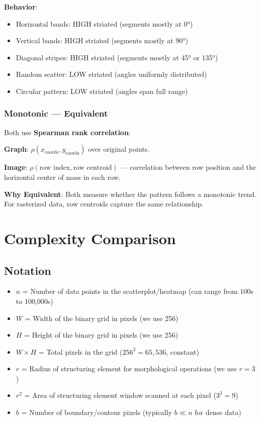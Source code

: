 \documentclass[11pt]{article}
\begin{document}
\textbf{Behavior}:
\begin{itemize}
    \item Horizontal bands: HIGH striated (segments mostly at 0°)
    \item Vertical bands: HIGH striated (segments mostly at 90°)
    \item Diagonal stripes: HIGH striated (segments mostly at 45° or 135°)
    \item Random scatter: LOW striated (angles uniformly distributed)
    \item Circular pattern: LOW striated (angles span full range)
\end{itemize}

\subsubsection{Monotonic — \textcolor{equivalent}{Equivalent}}

Both use \textbf{Spearman rank correlation}:

\textbf{Graph}: $\rho(x_{\text{coords}}, y_{\text{coords}})$ over original points.

\textbf{Image}: $\rho(\text{row index}, \text{row centroid})$ — correlation between row position and the horizontal center of mass in each row.

\textbf{Why Equivalent}: Both measure whether the pattern follows a monotonic trend. For rasterized data, row centroids capture the same relationship.

\section{Complexity Comparison}

\subsection{Notation}

\begin{itemize}
    \item $n$ = Number of data points in the scatterplot/heatmap (can range from 100s to 100,000s)
    \item $W$ = Width of the binary grid in pixels (we use 256)
    \item $H$ = Height of the binary grid in pixels (we use 256)
    \item $W \times H$ = Total pixels in the grid ($256^2 = 65,536$, constant)
    \item $r$ = Radius of structuring element for morphological operations (we use $r=3$)
    \item $r^2$ = Area of structuring element window scanned at each pixel ($3^2 = 9$)
    \item $b$ = Number of boundary/contour pixels (typically $b \ll n$ for dense data)
\end{itemize}
\end{document}
